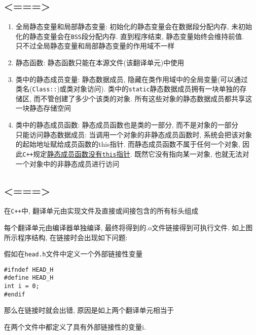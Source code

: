 \subsection{<===>}
\begin{enumerate}
	\item 全局静态变量和局部静态变量: 初始化的静态变量会在数据段分配内存, 未初始化的静态变量会在{\tt BSS}段分配内存. 
			直到程序结束, 静态变量始终会维持前值. 只不过全局静态变量和局部静态变量的作用域不一样
	\item 静态函数: 静态函数只能在本源文件(该翻译单元)中使用
	\item 类中的静态成员变量: 静态数据成员, 隐藏在类作用域中的全局变量(可以通过类名({\tt Class::})或类对象访问). 
			类中的{\tt static}静态数据成员拥有一块单独的存储区, 而不管创建了多少个该类的对象. 
			所有这些对象的静态数据成员都共享这一块静态存储空间
	\item 类中的静态成员函数: 静态成员函数也是类的一部分, 而不是对象的一部分
		\\  只能访问静态数据成员: 
			当调用一个对象的非静态成员函数时, 系统会把该对象的起始地址赋给成员函数的this指针. 
			而静态成员函数不属于任何一个对象, 因此{\tt C++}规定\uline{静态成员函数没有{\tt this}指针}. 
			既然它没有指向某一对象, 也就无法对一个对象中的非静态成员进行访问
\end{enumerate}
\subsection{<===>}

在{\tt C++}中, 翻译单元由实现文件及直接或间接包含的所有标头组成



\noindent 每个翻译单元由编译器单独编译, 最终将得到的.o文件链接得到可执行文件. 如上图所示程序结构, 在链接时会出现如下问题:

假如在{\tt head.h}文件中定义一个外部链接性变量

\begin{lstlisting}[xleftmargin=2em]
#ifndef HEAD_H
#define HEAD_H
int i = 0;
#endif
\end{lstlisting}
那么在链接时就会出错, 原因是如上两个翻译单元相当于



在两个文件中都定义了具有外部链接性的变量i.

